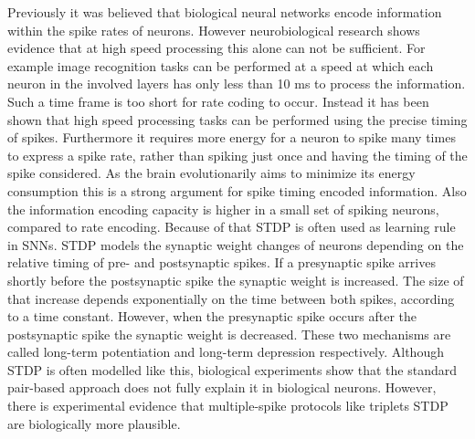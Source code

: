 Previously it was believed that biological neural networks encode information within the spike rates of neurons. However neurobiological research shows evidence that at high speed processing this alone can not be sufficient. For example image recognition tasks can be performed at a speed at which each neuron in the involved layers has only less than 10 ms to process the information. Such a time frame is too short for rate coding to occur. Instead it has been shown that high speed processing tasks can be performed using the precise timing of spikes. Furthermore it requires more energy for a neuron to spike many times to express a spike rate, rather than spiking just once and having the timing of the spike considered. As the brain evolutionarily aims to minimize its energy consumption this is a strong argument for spike timing encoded information. Also the information encoding capacity is higher in a small set of spiking neurons, compared to rate encoding. \citep{LearningInBiologicallyPlausibleSNN}
Because of that STDP is often used as learning rule in SNNs. STDP models the synaptic weight changes of neurons depending on the relative timing of pre- and postsynaptic spikes. If a presynaptic spike arrives shortly before the postsynaptic spike the synaptic weight is increased. The size of that increase depends exponentially on the time between both spikes, according to a time constant. However, when the presynaptic spike occurs after the postsynaptic spike the synaptic weight is decreased. These two mechanisms are called long-term potentiation and long-term depression respectively. Although STDP is often modelled like this, biological experiments show that the standard pair-based approach does not fully explain it in biological neurons. However, there is experimental evidence that multiple-spike protocols like triplets STDP are biologically more plausible. 
\citep{LearningInBiologicallyPlausibleSNN}	